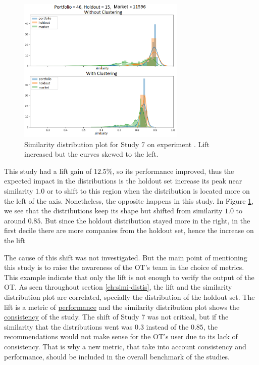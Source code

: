 \begin{figure}[!ht]
   \centering
   \includegraphics[width=8cm]{fig/ch4-worth-mentioning-study-7.png}
   \caption{Similarity distribution plot for Study 7 on experiment \nameExperimentII{}. Lift increased but the curves skewed to the left.}
   \label{fig:worth-mentioning-study-7}
\end{figure}

This study had a lift gain of $12.5\%$, so its performance improved, thus the expected impact in the distributions is the holdout set increase its peak near similarity $1.0$ or to shift to this region when the distribution is located more on the left of the axis. Nonetheless, the opposite happens in this study. In Figure \ref{fig:worth-mentioning-study-7}, we see that the distributions keep its shape but shifted from similarity $1.0$ to around $0.85$. But since the holdout distribution stayed more in the right, in the first decile there are more companies from the holdout set, hence the increase on the lift

The cause of this shift was not investigated. But the main point of mentioning this study is to raise the awareness of the OT's team in the choice of metrics. This example indicate that only the lift is not enough to verify the output of the OT. As seen throughout section \ref{ch:simi-distis}, the lift and the similarity distribution plot are correlated, specially the distribution of the holdout set. The lift is a metric of \underline{performance} and the similarity distribution plot shows the \underline{consistency} of the study. The shift of Study 7 was not critical, but if the similarity that the distributions went was $0.3$ instead of the $0.85$, the recommendations would not make sense for the OT's user due to its lack of consistency. That is why a new metric, that take into account consistency and performance, should be included in the overall benchmark of the studies.


